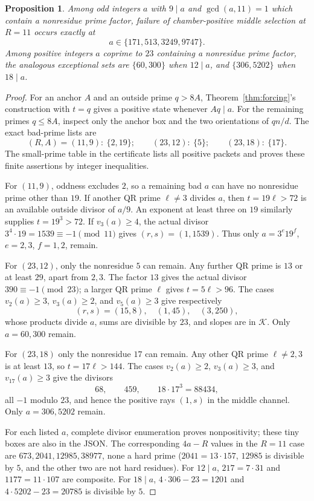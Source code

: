 \documentclass[11pt]{article}
\newtheorem{proposition}[theorem]{Proposition}
\theoremstyle{definition}\newtheorem{definition}[theorem]{Definition}
\theoremstyle{remark}\newtheorem{remark}[theorem]{Remark}
\newcommand{\K}{\mathcal K}
\begin{document}
\begin{proposition}\label{prop:hand}
Among odd integers $a$ with $9\mid a$ and $\gcd(a,11)=1$ which contain a nonresidue prime factor, failure of chamber-positive middle selection at $R=11$ occurs exactly at
\[
 a\in\{171,513,3249,9747\}.
\]
Among positive integers $a$ coprime to $23$ containing a nonresidue prime factor, the analogous exceptional sets are $\{60,300\}$ when $12\mid a$, and $\{306,5202\}$ when $18\mid a$.
\end{proposition}
\begin{proof}
For an anchor $A$ and an outside prime $q>8A$, Theorem~\ref{thm:forcing}'s construction with $t=q$ gives a positive state whenever $Aq\mid a$. For the remaining primes $q\le8A$, inspect only the anchor box and the two orientations of $qn/d$. The exact bad-prime lists are
\[
 (R,A)=(11,9):\ \{2,19\};\qquad
 (23,12):\ \{5\};\qquad
 (23,18):\ \{17\}.
\]
The small-prime table in the certificate lists all positive packets and proves these finite assertions by integer inequalities.

For $(11,9)$, oddness excludes $2$, so a remaining bad $a$ can have no nonresidue prime other than $19$. If another QR prime $\ell\ne3$ divides $a$, then $t=19\ell>72$ is an available outside divisor of $a/9$. An exponent at least three on $19$ similarly supplies $t=19^3>72$. If $v_3(a)\ge4$, the actual divisor $3^4\cdot19=1539\equiv-1\pmod{11}$ gives $(r,s)=(1,1539)$. Thus only $a=3^e19^f$, $e=2,3$, $f=1,2$, remain.

For $(23,12)$, only the nonresidue $5$ can remain. Any further QR prime is $13$ or at least $29$, apart from $2,3$. The factor $13$ gives the actual divisor $390\equiv-1\pmod{23}$; a larger QR prime $\ell$ gives $t=5\ell>96$. The cases $v_2(a)\ge3$, $v_3(a)\ge2$, and $v_5(a)\ge3$ give respectively
\[
 (r,s)=(15,8),\quad(1,45),\quad(3,250),
\]
whose products divide $a$, sums are divisible by $23$, and slopes are in $\K$. Only $a=60,300$ remain.

For $(23,18)$ only the nonresidue $17$ can remain. Any other QR prime $\ell\ne2,3$ is at least $13$, so $t=17\ell>144$. The cases $v_2(a)\ge2$, $v_3(a)\ge3$, and $v_{17}(a)\ge3$ give the divisors
\[
 68,\qquad459,\qquad18\cdot17^3=88434,
\]
all $-1$ modulo $23$, and hence the positive rays $(1,s)$ in the middle channel. Only $a=306,5202$ remain.

For each listed $a$, complete divisor enumeration proves nonpositivity; these tiny boxes are also in the JSON. The corresponding $4a-R$ values in the $R=11$ case are $673,2041,12985,38977$, none a hard prime ($2041=13\cdot157$, $12985$ is divisible by $5$, and the other two are not hard residues). For $12\mid a$, $217=7\cdot31$ and $1177=11\cdot107$ are composite. For $18\mid a$, $4\cdot306-23=1201$ and $4\cdot5202-23=20785$ is divisible by $5$.
\end{proof}
\end{document}
